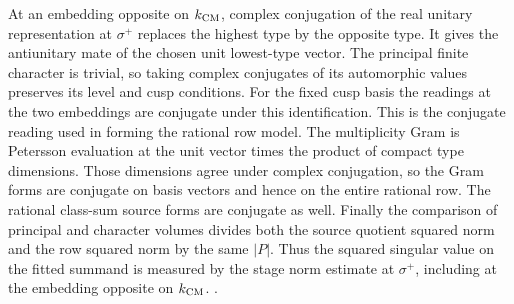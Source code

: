 At an embedding opposite on \(k_{\rm CM}\), complex
conjugation of the real unitary representation at
\(\sigma^+\) replaces the highest type by the opposite
type. It gives the antiunitary mate of the chosen
unit lowest-type vector. The principal finite character
is trivial, so taking complex conjugates of its
automorphic values preserves its level and cusp
conditions. For the fixed cusp basis the readings
at the two embeddings are conjugate under this
identification. This is the conjugate reading used
in forming the rational row model. The multiplicity
Gram is Petersson evaluation at the unit vector
times the product of compact type dimensions.
Those dimensions agree under complex conjugation,
so the Gram forms are conjugate on basis vectors
and hence on the entire rational row. The rational
class-sum source forms are conjugate as well.
Finally the comparison of principal and character
volumes divides both the source quotient squared
norm and the row squared norm by the same \(|P|\).
Thus the squared singular value on the fitted
summand is measured by the stage norm estimate at
\(\sigma^+\), including at the embedding opposite
on \(k_{\rm CM}\).
.

